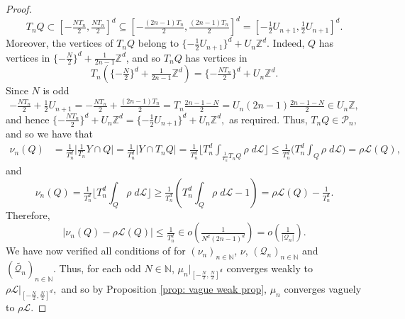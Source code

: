 \documentclass{article}
\newcommand{\Z}{\mathbb{Z}}
\newcommand{\N}{\mathbb{N}}
\newcommand{\leb}{\mc{L}}
\newcommand{\mc}[1]{\mathcal{#1}}
\begin{document}
\begin{proof}
$$T_nQ \subset \left[-\tfrac{NT_n}{2},\tfrac{NT_n}{2}\right]^d \subseteq\left[-\tfrac{(2n-1)T_n}{2},\tfrac{(2n-1)T_n}{2}\right]^d =\left[-\tfrac{1}{2}U_{n+1},\tfrac{1}{2}U_{n+1}\right]^d.$$
Moreover, the vertices of $T_nQ$ belong to $\{-\frac{1}{2}U_{n+1}\}^d+U_n\Z^d$. Indeed, $Q$ has vertices in $\{-\tfrac{N}{2}\}^d+\tfrac{1}{2n-1}\Z^d$, and so $T_nQ$ has vertices in 
$$T_n\left(\{-\tfrac{N}{2}\}^d+\tfrac{1}{2n-1}\Z^d\right) = \{-\tfrac{NT_n}{2}\}^d+{U_n}\Z^d.$$ Since $N$ is odd 
$$-\tfrac{NT_n}{2} + \tfrac{1}{2}U_{n+1}=-\tfrac{NT_n}{2} + \tfrac{(2n-1)T_n}{2} = T_n\tfrac{2n-1-N}{2}=U_n(2n-1)\tfrac{2n-1-N}{2} \in U_n\Z,$$ and hence $\{-\frac{NT_n}{2}\}^d+{U_n}\Z^d = \{-\frac{1}{2}U_{n+1}\}^d+U_n\Z^d,$ as required.
Thus, $T_nQ \in \mathcal{P}_n,$ and so we have that
\begin{equation*}
    \begin{split}
        \nu_n(Q) &= \tfrac{1}{T_n^d}\bigg|\tfrac{1}{T_n}Y \cap Q\bigg| =\tfrac{1}{T_n^d}\bigg|Y \cap T_nQ\bigg|
        = \tfrac{1}{T_n^d}\bigg\lfloor T_n^d\int_{\tfrac{1}{T_n}T_nQ}\rho\; d\leb\bigg\rfloor \leq \tfrac{1}{T_n^d}\bigg(T_n^d\int_{Q}\rho\; d\leb\bigg) = \rho\leb(Q),
    \end{split}
\end{equation*} and 
\begin{equation*}
    \nu_n(Q) = \tfrac{1}{T_n^d}\bigg\lfloor T_n^d\int_{Q}\rho\; d\leb\bigg\rfloor \geq \tfrac{1}{T_n^d}\left(T_n^d\int_{Q}\rho \; d\leb-1\right)=\rho\leb(Q) - \tfrac{1}{T_n^d}.
\end{equation*} Therefore,
\begin{equation*}
    |\nu_n(Q) - \rho\leb(Q)| \leq \tfrac{1}{T_n^d} \in o\left(\tfrac{1}{N^d(2n-1)^d}\right) = o\left(\tfrac{1}{|\mathcal{Q}_n|}\right).
\end{equation*} 
We have now verified all conditions of \cite[Proposition $4.1$]{bhat2025fast} for $(\nu_{n})_{n\in\N}$, $\nu$, $(\mathcal{Q}_{n})_{n\in\N}$ and $(\widetilde{\mathcal{Q}_{n}})_{n\in\N}$. Thus, for each odd $N \in \N$, $\mu_n|_{[-\frac{N}{2},\frac{N}{2}]^d}$ converges weakly to $\rho\leb|_{[-\frac{N}{2}, \frac{N}{2}]^d},$ and so by Proposition \ref{prop: vague weak prop}, $\mu_n$ converges vaguely to $\rho \leb.$ 
    \end{proof}
    
\end{document}

